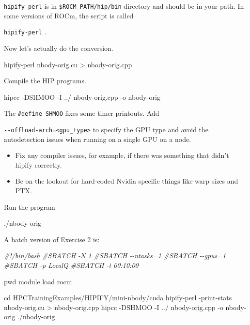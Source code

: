 \documentclass[
]{article}
\providecommand{\tightlist}{%
  \setlength{\itemsep}{0pt}\setlength{\parskip}{0pt}}
\let\oldtexttt\texttt
\renewcommand{\texttt}[1]{
  \colorbox{Light}{\oldtexttt{#1}}
}
\newenvironment{Shaded}{}{}
\newcommand{\BuiltInTok}[1]{#1}
\newcommand{\CommentTok}[1]{\textcolor[rgb]{0.38,0.63,0.69}{\textit{#1}}}
\newcommand{\ExtensionTok}[1]{#1}
\newcommand{\NormalTok}[1]{#1}
\newcommand{\OperatorTok}[1]{\textcolor[rgb]{0.40,0.40,0.40}{#1}}
\providecommand{\tightlist}{%
  \setlength{\itemsep}{0pt}\setlength{\parskip}{0pt}}
\begin{document}
\texttt{hipify-perl} is in \texttt{\$ROCM\_PATH/hip/bin} directory and
should be in your path. In some versions of ROCm, the script is called
\texttt{hipify-perl}.

Now let's actually do the conversion.

\begin{Shaded}
\begin{Highlighting}[]
\ExtensionTok{hipify{-}perl}\NormalTok{ nbody{-}orig.cu }\OperatorTok{\textgreater{}}\NormalTok{ nbody{-}orig.cpp}
\end{Highlighting}
\end{Shaded}

Compile the HIP programs.

\begin{Shaded}
\begin{Highlighting}[]
\ExtensionTok{hipcc}\NormalTok{ {-}DSHMOO {-}I ../ nbody{-}orig.cpp {-}o nbody{-}orig}
\end{Highlighting}
\end{Shaded}

The \texttt{\#define\ SHMOO} fixes some timer printouts. Add
\texttt{-\/-offload-arch=\textless{}gpu\_type\textgreater{}} to specify
the GPU type and avoid the autodetection issues when running on a single
GPU on a node.

\begin{itemize}
\tightlist
\item
  Fix any compiler issues, for example, if there was something that
  didn't hipify correctly.
\item
  Be on the lookout for hard-coded Nvidia specific things like warp
  sizes and PTX.
\end{itemize}

Run the program

\begin{Shaded}
\begin{Highlighting}[]
\ExtensionTok{./nbody{-}orig}
\end{Highlighting}
\end{Shaded}

A batch version of Exercise 2 is:

\begin{Shaded}
\begin{Highlighting}[]
\CommentTok{\#!/bin/bash}
\CommentTok{\#SBATCH {-}N 1}
\CommentTok{\#SBATCH {-}{-}ntasks=1}
\CommentTok{\#SBATCH {-}{-}gpus=1}
\CommentTok{\#SBATCH {-}p LocalQ}
\CommentTok{\#SBATCH {-}t 00:10:00}

\BuiltInTok{pwd}
\ExtensionTok{module}\NormalTok{ load rocm}

\BuiltInTok{cd}\NormalTok{ HPCTrainingExamples/HIPIFY/mini{-}nbody/cuda}
\ExtensionTok{hipify{-}perl}\NormalTok{ {-}print{-}stats nbody{-}orig.cu }\OperatorTok{\textgreater{}}\NormalTok{ nbody{-}orig.cpp}
\ExtensionTok{hipcc}\NormalTok{ {-}DSHMOO {-}I ../ nbody{-}orig.cpp {-}o nbody{-}orig}
\ExtensionTok{./nbody{-}orig}
\end{Highlighting}
\end{Shaded}
\end{document}
